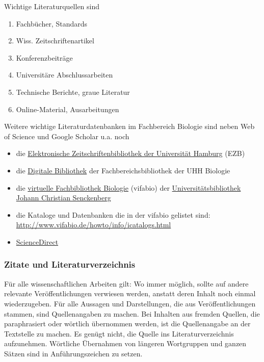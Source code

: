 \documentclass[a4paper,12pt]{article}
\providecommand{\tightlist}{%
  \setlength{\itemsep}{0pt}\setlength{\parskip}{0pt}}
\begin{document}
Wichtige Literaturquellen sind
\begin{enumerate}
\def\labelenumi{\arabic{enumi}.}
\tightlist
\item
  Fachbücher, Standards
\item
  Wiss. Zeitschriftenartikel
\item
  Konferenzbeiträge
\item
  Universitäre Abschlussarbeiten
\item
  Technische Berichte, graue Literatur
\item
  Online-Material, Ausarbeitungen
\end{enumerate}
Weitere wichtige Literaturdatenbanken im Fachbereich Biologie sind neben Web of Science und Google Scholar u.a. noch
\begin{itemize}
\tightlist
\item
  die \href{https://www.sub.uni-hamburg.de/recherche/elektronische-zeitschriftenbibliothek.html}{Elektronische Zeitschriftenbibliothek der Universität Hamburg} (EZB)
\item
  die \href{https://www.biologie.uni-hamburg.de/service/bibliotheken/bibliothek-fachbereichsbibliothek/digibib.html}{Digitale Bibliothek} der Fachbereichsbibliothek der UHH Biologie
\item
  die \href{http://www.vifabio.de/}{virtuelle Fachbibliothek Biologie} (vifabio) der \href{https://www.ub.uni-frankfurt.de/}{Universitätsbibliothek Johann Christian Senckenberg}
\item
  die Kataloge und Datenbanken die in der vifabio gelistet sind: \url{http://www.vifabio.de/howto/info/icatalogs.html}
\item
  \href{https://www.sciencedirect.com}{ScienceDirect}
\end{itemize}
\hypertarget{zitate-und-literaturverzeichnis}{%
\subsubsection{Zitate und Literaturverzeichnis}\label{zitate-und-literaturverzeichnis}}

Für alle wissenschaftlichen Arbeiten gilt: Wo immer möglich, sollte auf andere relevante Veröffentlichungen verwiesen werden, anstatt deren Inhalt noch einmal wiederzugeben. Für alle Aussagen und Darstellungen, die aus Veröffentlichungen stammen, sind Quellenangaben zu machen. Bei Inhalten aus fremden Quellen, die paraphrasiert oder wörtlich übernommen werden, ist die Quellenangabe an der Textstelle zu machen. Es genügt nicht, die Quelle ins Literaturverzeichnis aufzunehmen. Wörtliche Übernahmen von längeren Wortgruppen und ganzen Sätzen sind in Anführungszeichen zu setzen.
\end{document}
